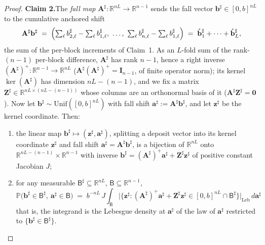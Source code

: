 \documentclass[11pt]{article}
\theoremstyle{definition}
\begin{document}
\begin{proof}
\smallskip\noindent\textbf{Claim 2.}\quad The \emph{fall map} $\mathbf{A}^{\sharp}:\mathbb{R}^{nL}\to\mathbb{R}^{n-1}$ sends the fall vector $\mathbf{b}^{\sharp}\in[0,b]^{nL}$ to the cumulative anchored shift
\[
  \mathbf{A}^{\sharp}\mathbf{b}^{\sharp} \;=\; \Bigl(\textstyle\sum_\ell b^{\sharp}_{2,\ell}-\sum_\ell b^{\sharp}_{1,\ell},\ \ldots,\ \sum_\ell b^{\sharp}_{n,\ell}-\sum_\ell b^{\sharp}_{1,\ell}\Bigr) \;=\; \mathring{\mathbf{b}}^{\sharp}_1+\cdots+\mathring{\mathbf{b}}^{\sharp}_L ,
\]
the sum of the per-block increments of Claim~1. As an $L$-fold sum of the rank-$(n-1)$ per-block difference, $\mathbf{A}^{\sharp}$ has rank $n-1$, hence a right inverse $(\mathbf{A}^{\sharp})^{+}:\mathbb{R}^{n-1}\to\mathbb{R}^{nL}$ ($\mathbf{A}^{\sharp}(\mathbf{A}^{\sharp})^{+}=\mathbf{I}_{n-1}$, of finite operator norm); its kernel $\ker(\mathbf{A}^{\sharp})$ has dimension $nL-(n-1)$, and we fix a matrix $\mathbf{Z}^{\sharp}\in\mathbb{R}^{nL\times(nL-(n-1))}$ whose columns are an orthonormal basis of it ($\mathbf{A}^{\sharp}\mathbf{Z}^{\sharp}=\mathbf{0}$). Now let $\mathbf{b}^{\sharp}\sim\mathrm{Unif}([0,b]^{nL})$ with fall shift $\mathbf{a}^{\sharp} := \mathbf{A}^{\sharp}\mathbf{b}^{\sharp}$, and let $\mathbf{z}^{\sharp}$ be the kernel coordinate. Then:
\begin{enumerate}[label=(\Roman*)]
  \item the linear map $\mathbf{b}^{\sharp}\mapsto(\mathbf{z}^{\sharp},\mathbf{a}^{\sharp})$, splitting a deposit vector into its kernel coordinate $\mathbf{z}^{\sharp}$ and fall shift $\mathbf{a}^{\sharp}=\mathbf{A}^{\sharp}\mathbf{b}^{\sharp}$, is a bijection of $\mathbb{R}^{nL}$ onto $\mathbb{R}^{nL-(n-1)}\times\mathbb{R}^{n-1}$ with inverse $\mathbf{b}^{\sharp}=(\mathbf{A}^{\sharp})^{+}\mathbf{a}^{\sharp}+\mathbf{Z}^{\sharp}\mathbf{z}^{\sharp}$ of positive constant Jacobian $J$;
  \item for any measurable $\mathsf{B}^{\sharp}\subseteq\mathbb{R}^{nL}$, $\mathsf{B}\subseteq\mathbb{R}^{n-1}$,
  \[
    \mathbb{P}\bigl(\mathbf{b}^{\sharp}\in \mathsf{B}^{\sharp},\ \mathbf{a}^{\sharp}\in \mathsf{B}\bigr)
    \;=\; b^{-nL}\,J\int_{\mathsf{B}}\bigl|\bigl\{\mathbf{z}^{\sharp} : (\mathbf{A}^{\sharp})^{+}\mathbf{a}^{\sharp}+\mathbf{Z}^{\sharp}\mathbf{z}^{\sharp}\in[0,b]^{nL}\cap \mathsf{B}^{\sharp}\bigr\}\bigr|_{\mathrm{Leb}}\,d\mathbf{a}^{\sharp}
  \]
  that is, the integrand is the Lebesgue density at $\mathbf{a}^{\sharp}$ of the law of $\mathbf{a}^{\sharp}$ restricted to $\{\mathbf{b}^{\sharp}\in \mathsf{B}^{\sharp}\}$.
\end{enumerate}


\end{proof}
\end{document}
